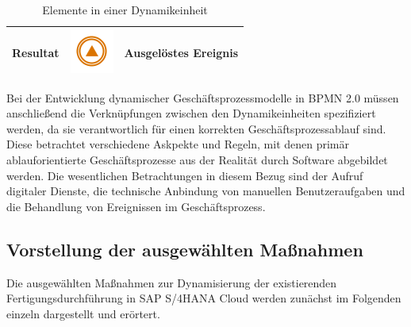\begin{table}[H]
\begin{tabularx}{\textwidth}{l c X}
		Resultat &   
		\begin{minipage}{.1\textwidth}
            \includegraphics[width=\linewidth]{img/endevent.png}
        \end{minipage}  &
		Ausgelöstes Ereignis  \\
	    \bottomrule
	\end{tabularx}
	\caption{\label{tab:dynmaikelemente}Elemente in einer Dynamikeinheit}
\end{table}

Bei der Entwicklung dynamischer Geschäftsprozessmodelle in \ac{BPMN} 2.0 müssen anschließend die Verknüpfungen zwischen den Dynamikeinheiten spezifiziert werden, da sie verantwortlich für einen korrekten Geschäftsprozessablauf sind. 
Diese betrachtet verschiedene Askpekte und Regeln, mit denen primär ablauforientierte Geschäftsprozesse aus der Realität durch Software abgebildet werden. Die wesentlichen Betrachtungen in diesem Bezug sind der Aufruf digitaler Dienste, die technische Anbindung von manuellen Benutzeraufgaben und die Behandlung von Ereignissen im Geschäftsprozess.

\newpage

\subsection{Vorstellung der ausgewählten Maßnahmen}
Die ausgewählten Maßnahmen zur Dynamisierung der existierenden Fertigungsdurchführung in SAP S/4HANA Cloud werden zunächst im Folgenden einzeln dargestellt und erörtert.

